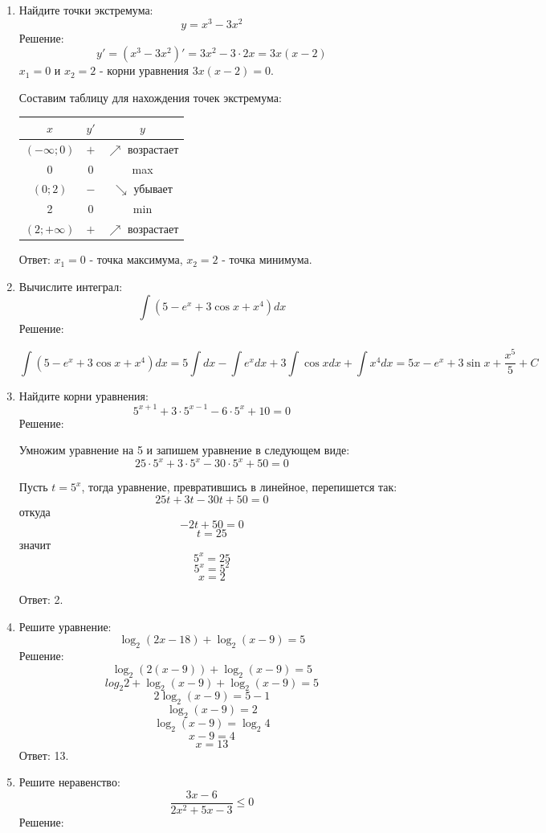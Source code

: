 \documentclass{article}
\renewcommand{\le}{\ensuremath{\leqslant}}
\begin{document}
\begin{enumerate}
\item %
Найдите точки экстремума:
$$y=x^3-3x^2$$
Решение:
$$y'=\left(x^3-3x^2\right)'=3x^2-3\cdot2x=3x(x-2)$$
$x_1=0$ и $x_2=2$ - корни уравнения $3x(x-2)=0$.

Составим таблицу для нахождения точек экстремума:

\begin{center}
\begin{tabular}{|c|c|c|}
\hline
$x$ & $y'$ & $y$ \\
\hline\hline
$\left(-\infty;0\right)$ & $+$ & $\nearrow$ возрастает \\
\hline
0 & 0 & max\\
\hline
$\left(0;2\right)$ & $-$ & $\searrow$ убывает\\
\hline
2 & 0 & min \\
\hline
$\left(2;+\infty\right)$ & $+$ & $\nearrow$ возрастает \\
\hline
\end{tabular}
\end{center}

Ответ: $x_1=0$ - точка максимума, $x_2=2$ - точка минимума.

\item %
Вычислите интеграл:
$$\int{\left(5-e^x+3\cos{x}+x^4\right)dx}$$
Решение:

$$\int{\left(5-e^x+3\cos{x}+x^4\right)dx}=5\int{dx}-\int{e^x dx}+3\int{\cos{x}dx}+\int{x^4dx}=5x-e^x+3\sin{x}+\frac{x^5}{5}+C$$

\item %
Найдите корни уравнения:
$$5^{x+1}+3\cdot5^{x-1}-6\cdot5^x+10=0$$
Решение:

Умножим уравнение на 5 и запишем уравнение в следующем виде: $$25\cdot5^x+3\cdot5^x-30\cdot5^x+50=0$$

Пусть $t=5^x$, тогда уравнение, превратившись в линейное, перепишется так: $$25t+3t-30t+50=0$$ откуда $$-2t+50=0$$ $$t=25$$ значит $$5^x=25$$ $$5^x=5^2$$ $$x=2$$

Ответ: 2.

\item %
Решите уравнение:
$$\log_2{(2x-18)}+\log_2{(x-9)}=5$$
Решение:
$$\log_2{(2(x-9))}+\log_2{(x-9)}=5$$
$$log_2{2}+\log_2{(x-9)}+\log_2{(x-9)}=5$$
$$2\log_2{(x-9)}=5-1$$
$$\log_2{(x-9)}=2$$
$$\log_2{(x-9)}=\log_2{4}$$
$$x-9=4$$
$$x=13$$
Ответ: 13.

\item %
Решите неравенство:
$$\frac{3x-6}{2x^2+5x-3}\le0$$
Решение:


\end{enumerate}
\end{document}
